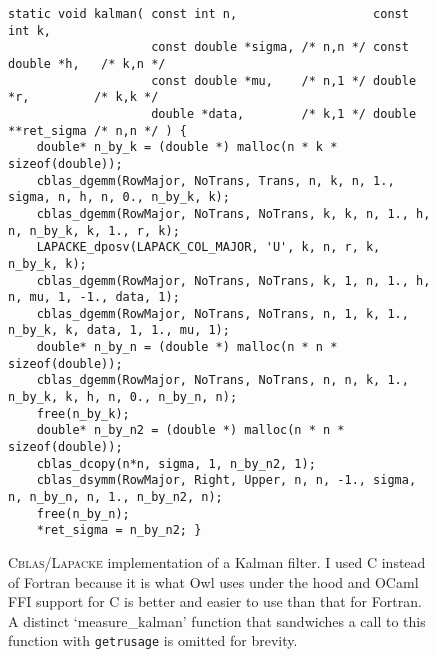 \begin{figure}[h]
\begin{center}
    \begin{verbatim}
static void kalman( const int n,                   const int k,                
                    const double *sigma, /* n,n */ const double *h,   /* k,n */
                    const double *mu,    /* n,1 */ double *r,         /* k,k */
                    double *data,        /* k,1 */ double **ret_sigma /* n,n */ ) {
    double* n_by_k = (double *) malloc(n * k * sizeof(double));
    cblas_dgemm(RowMajor, NoTrans, Trans, n, k, n, 1., sigma, n, h, n, 0., n_by_k, k);
    cblas_dgemm(RowMajor, NoTrans, NoTrans, k, k, n, 1., h, n, n_by_k, k, 1., r, k);
    LAPACKE_dposv(LAPACK_COL_MAJOR, 'U', k, n, r, k, n_by_k, k);
    cblas_dgemm(RowMajor, NoTrans, NoTrans, k, 1, n, 1., h, n, mu, 1, -1., data, 1);
    cblas_dgemm(RowMajor, NoTrans, NoTrans, n, 1, k, 1., n_by_k, k, data, 1, 1., mu, 1);
    double* n_by_n = (double *) malloc(n * n * sizeof(double));
    cblas_dgemm(RowMajor, NoTrans, NoTrans, n, n, k, 1., n_by_k, k, h, n, 0., n_by_n, n);
    free(n_by_k);
    double* n_by_n2 = (double *) malloc(n * n * sizeof(double));
    cblas_dcopy(n*n, sigma, 1, n_by_n2, 1);
    cblas_dsymm(RowMajor, Right, Upper, n, n, -1., sigma, n, n_by_n, n, 1., n_by_n2, n);
    free(n_by_n);
    *ret_sigma = n_by_n2; }
    \end{verbatim}
    \caption{\textsc{Cblas/Lapacke} implementation of a Kalman filter. I used C instead
        of Fortran because it is what Owl uses under the hood and OCaml FFI
        support for C is better and easier to use than that for Fortran. A distinct
        `measure\_kalman' function that sandwiches a call to this function with
        \texttt{getrusage} is omitted for brevity.}\label{fig:cblas_kalman}

\end{center}
\end{figure}

